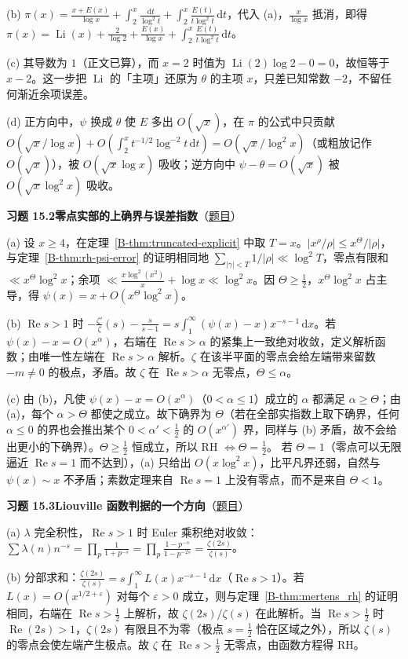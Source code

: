 \documentclass[11pt,a4paper]{article}
\DeclareMathOperator{\Li}{Li}
\newcommand{\dd}{\,\mathrm{d}}
\renewcommand{\Re}{\operatorname{Re}}
\newcommand{\bref}[1]{\ref*{B-#1}}
\newcommand{\Sol}[2]{%
  \par\addvspace{1.2em}\noindent
  \hypertarget{s:#1}{}\textbf{习题 #1\quad #2}\hfill{\small（\hyperlink{q:#1}{题目}）}\par
  \nopagebreak\smallskip}
\begin{document}
(b) $\pi(x)=\frac{x+E(x)}{\log x}+\int_2^x\frac{\dd t}{\log^2t}+\int_2^x\frac{E(t)}{t\log^2t}\dd t$，代入 (a)，$\frac x{\log x}$ 抵消，即得 $\pi(x)=\Li(x)+\frac2{\log2}+\frac{E(x)}{\log x}+\int_2^x\frac{E(t)}{t\log^2t}\dd t$。

(c) 其导数为 $1$（正文已算），而 $x=2$ 时值为 $\Li(2)\log2-0=0$，故恒等于 $x-2$。这一步把 $\Li$ 的「主项」还原为 $\theta$ 的主项 $x$，只差已知常数 $-2$，不留任何渐近余项误差。

(d) 正方向中，$\psi$ 换成 $\theta$ 使 $E$ 多出 $O(\sqrt x)$，在 $\pi$ 的公式中只贡献 $O(\sqrt x/\log x)+O(\int_2^x t^{-1/2}\log^{-2}t\dd t)=O(\sqrt x/\log^2x)$（或粗放记作 $O(\sqrt x)$），被 $O(\sqrt x\log x)$ 吸收；逆方向中 $\psi-\theta=O(\sqrt x)$ 被 $O(\sqrt x\log^2x)$ 吸收。

\Sol{15.2}{零点实部的上确界与误差指数}
(a) 设 $x\ge4$，在定理~\bref{thm:truncated-explicit} 中取 $T=x$。$|x^\rho/\rho|\le x^\Theta/|\rho|$，与定理~\bref{thm:rh-psi-error} 的证明相同地 $\sum_{|\gamma|<T}1/|\rho|\ll\log^2T$，零点有限和 $\ll x^\Theta\log^2x$；余项 $\ll\frac{x\log^2(x^2)}x+\log x\ll\log^2x$。因 $\Theta\ge\frac12$，$x^\Theta\log^2x$ 占主导，得 $\psi(x)=x+O(x^\Theta\log^2x)$。

(b) $\Re s>1$ 时 $-\frac{\zeta'}{\zeta}(s)-\frac s{s-1}=s\int_1^\infty(\psi(x)-x)x^{-s-1}\dd x$。若 $\psi(x)-x=O(x^\alpha)$，右端在 $\Re s>\alpha$ 的紧集上一致绝对收敛，定义解析函数；由唯一性左端在 $\Re s>\alpha$ 解析。$\zeta$ 在该半平面的零点会给左端带来留数 $-m\neq0$ 的极点，矛盾。故 $\zeta$ 在 $\Re s>\alpha$ 无零点，$\Theta\le\alpha$。

(c) 由 (b)，凡使 $\psi(x)-x=O(x^\alpha)$（$0<\alpha\le1$）成立的 $\alpha$ 都满足 $\alpha\ge\Theta$；由 (a)，每个 $\alpha>\Theta$ 都使之成立。故下确界为 $\Theta$（若在全部实指数上取下确界，任何 $\alpha\le0$ 的界也会推出某个 $0<\alpha'<\frac12$ 的 $O(x^{\alpha'})$ 界，同样与 (b) 矛盾，故不会给出更小的下确界）。$\Theta\ge\frac12$ 恒成立，所以 RH $\iff\Theta=\frac12$。
若 $\Theta=1$（零点可以无限逼近 $\Re s=1$ 而不达到），(a) 只给出 $O(x\log^2x)$，比平凡界还弱，自然与 $\psi(x)\sim x$ 不矛盾；素数定理来自 $\Re s=1$ 上没有零点，而不是来自 $\Theta<1$。

\Sol{15.3}{Liouville 函数判据的一个方向}
(a) $\lambda$ 完全积性，$\Re s>1$ 时 Euler 乘积绝对收敛：$\sum\lambda(n)n^{-s}=\prod_p\frac1{1+p^{-s}}=\prod_p\frac{1-p^{-s}}{1-p^{-2s}}=\frac{\zeta(2s)}{\zeta(s)}$。

(b) 分部求和：$\frac{\zeta(2s)}{\zeta(s)}=s\int_1^\infty L(x)x^{-s-1}\dd x$（$\Re s>1$）。若 $L(x)=O(x^{1/2+\varepsilon})$ 对每个 $\varepsilon>0$ 成立，则与定理~\bref{thm:mertens_rh} 的证明相同，右端在 $\Re s>\frac12$ 上解析，故 $\zeta(2s)/\zeta(s)$ 在此解析。当 $\Re s>\frac12$ 时 $\Re(2s)>1$，$\zeta(2s)$ 有限且不为零（极点 $s=\frac12$ 恰在区域之外），所以 $\zeta(s)$ 的零点会使左端产生极点。故 $\zeta$ 在 $\Re s>\frac12$ 无零点，由函数方程得 RH。
\end{document}
